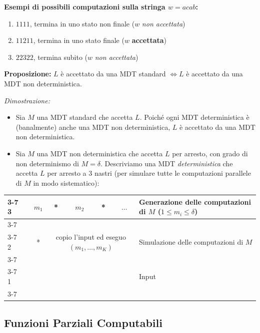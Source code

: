 \textbf{Esempi di possibili computazioni sulla stringa $w = acab$:}
\begin{enumerate}
    \item $1111$, termina in uno stato non finale ($w$ \textit{non accettata})
    \item $11211$, termina in uno stato finale ($w$ \textbf{accettata})
    \item $22322$, termina subito ($w$ \textit{non accettata})
\end{enumerate}

\vspace{0.6cm}
\textbf{Proposizione:} $L$ è accettato da una MDT standard $\iff L$ è accettato da una MDT non deterministica.

\textit{Dimostrazione:}
\begin{itemize}
    \item[$\implies$)] Sia $M$ una MDT standard che accetta $L$. Poiché ogni MDT deterministica è (banalmente) anche una MDT non deterministica, $L$ è accettato da una MDT non deterministica.
    \item[$\impliedby$)] Sia $M$ una MDT non deterministica che accetta $L$ per arresto, con grado di non determinismo di $M = \delta$. Descriviamo una MDT \textit{deterministica} che accetta $L$ per arresto a 3 nastri (per simulare tutte le computazioni parallele di $M$ in modo sistematico):
\end{itemize}

\begin{center}
\begin{tabular}{ll|c|c|c|c|c|l}
\cline{3-7}
3 & & $m_1$ & * & $m_2$ & * & $\dots$ & Generazione delle computazioni di $M$ ($1 \le m_i \le \delta$) \\
\cline{3-7}
\multicolumn{8}{c}{} \\
\cline{3-7}
2 & & * & \multicolumn{4}{c|}{\scriptsize copio l'input ed eseguo $(m_1,\dots,m_K)$} & Simulazione delle computazioni di $M$ \\
\cline{3-7}
\multicolumn{8}{c}{} \\
\cline{3-7}
1 & & \multicolumn{5}{c|}{} & Input \\
\cline{3-7}
\end{tabular}
\end{center}

\vspace{0.8cm}
\subsection{Funzioni Parziali Computabili}

